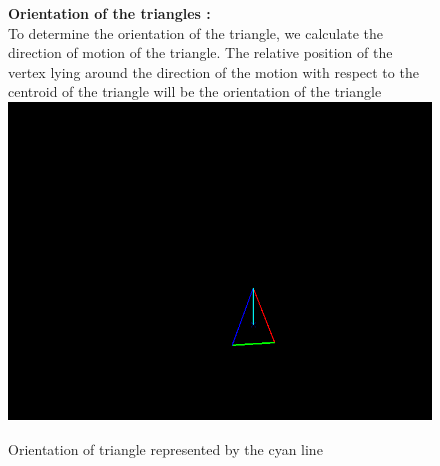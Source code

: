 \documentclass[10pt, twocolumn]{article}
\begin{document}
\begin{figure}[H]
\hspace*{10pt}
{\bf Orientation of the triangles :}\\
\hspace*{20pt}To determine the orientation of the triangle, we calculate the direction of motion of the triangle. The relative position of the vertex lying around the direction of the motion with respect to the centroid of the triangle will be the orientation of the triangle\\ 
\center
\includegraphics[scale=0.3]{orientation.png}
\caption{Orientation of triangle represented by the cyan line}
\end{figure}
\end{document}
